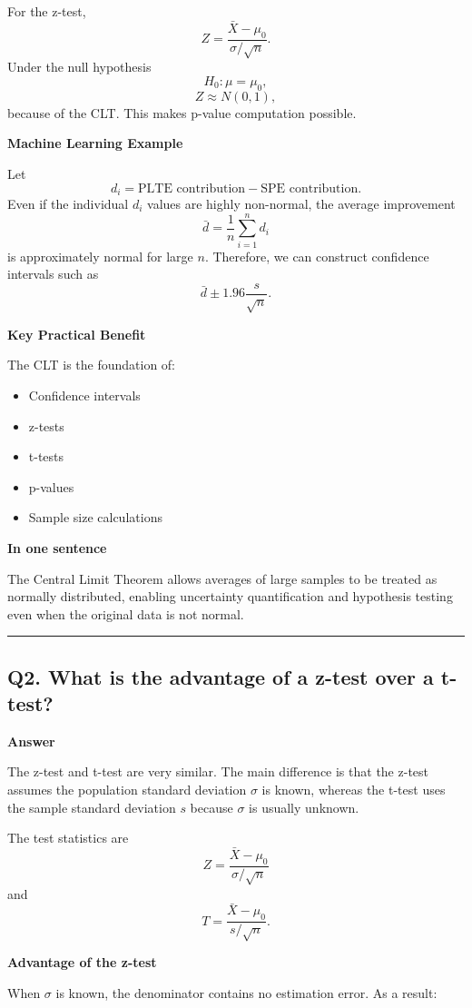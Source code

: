 \documentclass[11pt]{article}
\begin{document}
For the z-test,
\[
Z=\frac{\bar X-\mu_0}{\sigma/\sqrt n}.
\]
Under the null hypothesis
\[
H_0:\mu=\mu_0,
\]
\[
Z \approx N(0,1),
\]
because of the CLT. This makes p-value computation possible.

\textbf{Machine Learning Example}

Let
\[
d_i= \text{PLTE contribution} - \text{SPE contribution}.
\]
Even if the individual $d_i$ values are highly non-normal, the average improvement
\[
\bar d=\frac{1}{n}\sum_{i=1}^{n} d_i
\]
is approximately normal for large $n$. Therefore, we can construct confidence intervals such as
\[
\bar d \pm 1.96\frac{s}{\sqrt n}.
\]

\textbf{Key Practical Benefit}

The CLT is the foundation of:
\begin{itemize}
    \item Confidence intervals
    \item z-tests
    \item t-tests
    \item p-values
    \item Sample size calculations
\end{itemize}

\textbf{In one sentence}

The Central Limit Theorem allows averages of large samples to be treated as normally distributed, enabling uncertainty quantification and hypothesis testing even when the original data is not normal.

\vspace{5mm}
\hrule
\vspace{5mm}

\subsection*{Q2. What is the advantage of a z-test over a t-test?}

\textbf{Answer}

The z-test and t-test are very similar. The main difference is that the z-test assumes the population standard deviation \(\sigma\) is known, whereas the t-test uses the sample standard deviation \(s\) because \(\sigma\) is usually unknown.

The test statistics are
\[
Z=\frac{\bar X-\mu_0}{\sigma/\sqrt n}
\]
and
\[
T=\frac{\bar X-\mu_0}{s/\sqrt n}.
\]

\textbf{Advantage of the z-test}

When \(\sigma\) is known, the denominator contains no estimation error. As a result:
\end{document}

